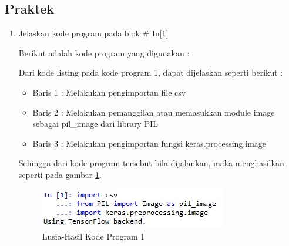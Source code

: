 \subsection{Praktek}
\begin{enumerate}
\item Jelaskan kode program pada blok \# In[1]
	\par Berikut adalah kode program yang digunakan :
	
	\par Dari kode listing pada kode program 1, dapat dijelaskan seperti berikut :
	\begin{itemize}
	\item Baris 1	: Melakukan pengimportan file csv
	\item Baris 2	: Melakukan pemanggilan atau memasukkan module image sebagai pil\_image dari library PIL
	\item Baris 3	: Melakukan pengimportan fungsi keras.processing.image 
	\end{itemize}
	\par Sehingga dari kode program tersebut bila dijalankan, maka menghasilkan seperti pada gambar \ref{7B1}.
		\begin{figure}[!hbtp]
		\centering
		\includegraphics[scale=0.5]{figures/w1.jpg}
		\caption{Lusia-Hasil Kode Program 1}
		\label{7B1}
		\end{figure}
	

\end{enumerate}
